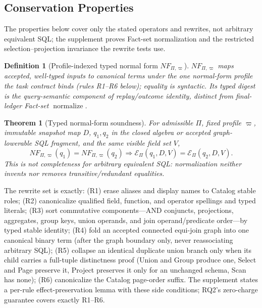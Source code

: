 \documentclass[10pt,journal,compsoc]{IEEEtran}
\newcommand{\effect}{\mathcal{E}}
\newtheorem{definition}{Definition}
\newtheorem{theorem}{Theorem}
\begin{document}
\subsection{Conservation Properties}

The properties below cover only the stated operators and rewrites, not
arbitrary equivalent SQL; the supplement proves Fact-set normalization and the
restricted selection--projection invariance the rewrite tests use.

\begin{definition}[Profile-indexed typed normal form $NF_{\Pi,\varpi}$]
\label{def:nf}
$NF_{\Pi,\varpi}$ maps accepted, well-typed inputs to canonical terms under the
one normal-form profile the task contract binds (rules R1--R6 below);
equality is syntactic. Its typed digest is the query-semantic component of
replay/outcome identity, distinct from final-ledger Fact-set
$\operatorname{normalize}$.
\end{definition}

\begin{theorem}[Typed normal-form soundness]
\label{thm:nf-soundness}
For admissible $\Pi$, fixed profile $\varpi$, immutable snapshot map $D$, $q_1,q_2$ in the closed
algebra or accepted graph-lowerable SQL fragment, and the same visible field
set $V$,
\[
 NF_{\Pi,\varpi}(q_1)=NF_{\Pi,\varpi}(q_2)\Longrightarrow
 \effect_\Pi(q_1,D,V)=\effect_\Pi(q_2,D,V).
\]
This is not completeness for arbitrary equivalent SQL: normalization neither
invents nor removes transitive/redundant equalities.
\end{theorem}
The rewrite set is exactly: (R1) erase aliases and display names to Catalog
stable roles; (R2) canonicalize qualified field, function, and operator
spellings and typed literals; (R3) sort commutative components---AND
conjuncts, projections, aggregates, group keys, union operands, and join
operand/predicate order---by typed stable identity; (R4) fold an accepted
connected equi-join graph into one canonical binary term (after the graph
boundary only, never reassociating arbitrary SQL); (R5) collapse an
identical duplicate union branch only when its child carries a full-tuple
distinctness proof (Union and Group produce one, Select and Page preserve
it, Project preserves it only for an unchanged schema, Scan has none);
(R6) canonicalize the Catalog page-order suffix. The supplement states a
per-rule effect-preservation lemma with these side conditions; RQ2's
zero-charge guarantee covers exactly R1--R6.
\end{document}
